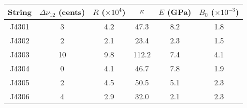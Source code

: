 \begin{tabular}{cccccc}
\toprule
String &  $\Delta \nu_{12}$ (cents) &  $R$ ($\times 10^4$) &  $\kappa$ &  $E$ (GPa) &  $B_0$ ($\times 10^{-3}$) \\
\midrule
 J4301 &                          3 &                  4.2 &      47.3 &        8.2 &                       1.8 \\
 J4302 &                          2 &                  2.1 &      23.4 &        2.3 &                       1.5 \\
 J4303 &                         10 &                  9.8 &     112.2 &        7.4 &                       4.1 \\
 J4304 &                          0 &                  4.1 &      46.7 &        7.8 &                       1.9 \\
 J4305 &                          2 &                  4.5 &      50.5 &        5.1 &                       2.3 \\
 J4306 &                          4 &                  2.9 &      32.0 &        2.1 &                       2.3 \\
\bottomrule
\end{tabular}

